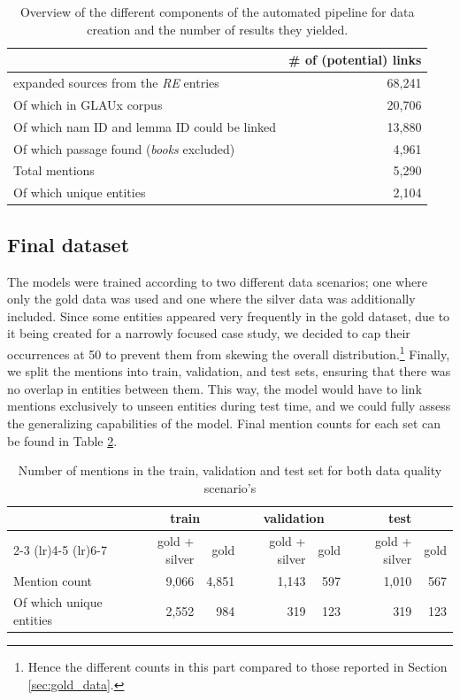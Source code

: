 \documentclass[final]{anthology-ch}
\begin{document}
\begin{table}[ht]
\centering
\begin{tabular}{lr}
& \# of (potential) links  \\
\toprule
expanded sources from the \textit{RE} entries & 68,241  \\
Of which in GLAUx corpus & 20,706 \\
Of which nam ID and lemma ID could be linked & 13,880 \\
Of which passage found (\textit{books} excluded) & 4,961\\
\midrule
Total mentions & 5,290 \\
Of which unique entities & 2,104 \\
\bottomrule
\end{tabular}
\caption{Overview of the different components of the automated pipeline for data creation and the number of results they yielded.}
\label{tab:pipeline_overview}
\end{table}

\subsection{Final dataset}
The models were trained according to two different data scenarios; one where only the gold data was used and one where the silver data was additionally included. Since some entities appeared very frequently in the gold dataset, due to it being created for a narrowly focused case study, we decided to cap their occurrences at 50 to prevent them from skewing the overall distribution.\footnote{Hence the different counts in this part compared to those reported in Section \ref{sec:gold_data}.} Finally, we split the mentions into train, validation, and test sets, ensuring that there was no overlap in entities between them. This way, the model would have to link mentions exclusively to unseen entities during test time, and we could fully assess the generalizing capabilities of the model. Final mention counts for each set can be found in Table \ref{tab:final_entity_counts}.

\begin{table}[ht]
\centering
\begin{tabular}{lrrrrrr}
\toprule
& \multicolumn{2}{c}{{\bf train}} & \multicolumn{2}{c}{{\bf validation}} & \multicolumn{2}{c}{{\bf test}}\\
\cmidrule(lr){2-3} \cmidrule(lr){4-5} \cmidrule(lr){6-7}
& gold + silver & gold & gold + silver & gold & gold + silver & gold \\
\midrule
Mention count & 9,066 & 4,851 & 1,143 & 597 & 1,010 & 567 \\
Of which unique entities & 2,552 & 984 & 319 & 123 & 319 & 123 \\
\bottomrule
\end{tabular}
\caption{Number of mentions in the train, validation and test set for both data quality scenario's}
\label{tab:final_entity_counts}
\end{table}
\newpage
\end{document}
